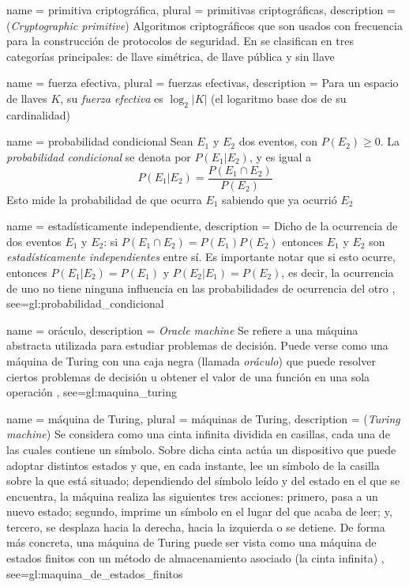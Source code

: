 {
  name = primitiva criptográfica,
  plural = primitivas criptográficas,
  description = {
    (\textit{Cryptographic primitive}) Algoritmos criptográficos que son usados
    con frecuencia para la construcción de protocolos de seguridad. En
    \cite{menezes} se clasifican en tres categorías principales: de llave
    simétrica, de llave pública y sin llave%
  }
}

{
  name = fuerza efectiva,
  plural = fuerzas efectivas,
  description = {
    Para un espacio de llaves $ K $, su \textit{fuerza efectiva} es
    $ \log_2 | K | $ (el logaritmo base dos de su cardinalidad)%
  }
}

{
  name = probabilidad condicional
}
{%
  Sean $ E_1 $ y $ E_2 $ dos eventos, con $ P(E_2) \ge 0 $. La
  \textit{probabilidad condicional} se denota por $ P(E_1 | E_2) $, y es
  igual a
  $$ P(E_1 | E_2) = \frac{P(E_1 \cap E_2)}{P(E_2)} $$
  Esto mide la probabilidad de que ocurra $ E_1 $ sabiendo que ya ocurrió
  $ E_2 $%
}

{
  name = estadísticamente independiente,
  description = {
    Dicho de la ocurrencia de dos eventos $ E_1 $ y $ E_2 $: si
    $ P(E_1 \cap E_2) = P(E_1) P(E_2) $ entonces $ E_1 $ y $ E_2 $ son
    \textit{estadísticamente independientes} entre sí. Es importante notar
    que si esto ocurre, entonces $ P(E_1 | E_2) = P(E_1) $ y
    $ P(E_2 | E_1) = P(E_2) $, es decir, la ocurrencia de uno no tiene ninguna
    influencia en las probabilidades de ocurrencia del otro%
  },
  see={gl:probabilidad_condicional}
}

{
  name = oráculo,
  description = {
    \textit{Oracle machine} Se refiere a una máquina abstracta utilizada para
    estudiar problemas de decisión. Puede verse como una máquina de Turing con
    una caja negra (llamada \textit{oráculo}) que puede resolver ciertos
    problemas de decisión u obtener el valor de una función en una sola
    operación%
  },
  see={gl:maquina_turing}
}

{
  name = máquina de Turing,
  plural = máquinas de Turing,
  description = {
    (\textit{Turing machine}) Se considera como una cinta infinita dividida
    en casillas, cada una de las cuales contiene un símbolo. Sobre dicha cinta
    actúa un dispositivo que puede adoptar distintos estados y que, en cada
    instante, lee un símbolo de la casilla sobre la que está situado;
    dependiendo del símbolo leído y del estado en el que se encuentra, la
    máquina realiza las siguientes tres acciones: primero, pasa a un nuevo
    estado; segundo, imprime un símbolo en el lugar del que acaba de leer;
    y, tercero, se desplaza hacia la derecha, hacia la izquierda o se detiene.
    De forma más concreta, una máquina de Turing puede ser vista como una
    máquina de estados finitos con un método de almacenamiento asociado (la
    cinta infinita) \cite{minsky, DBLP:books/daglib/0023088,
    DBLP:books/daglib/0032222}%
  },
  see={gl:maquina_de_estados_finitos}
}

